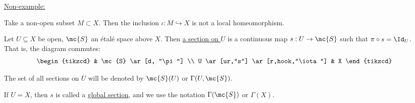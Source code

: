 \documentclass[x11names,reqno,14pt]{extarticle}
\newcommand{\into}{\hookrightarrow}
\begin{document}
\underline{Non-example:} 

Take a non-open subset $M \subset X$. Then the inclusion $\iota:M\into X$ is not a local homeomorphism. 


Let $U\subseteq X$ be open, $\mc{S}$ an \'etal\'e space above $X$. Then \underline{a section on $U$} is a continuous map $s:U\to\mc{S}$ such that $\pi\circ s = \Id_U$. That is, the diagram commutes:
\[
\begin{tikzcd}
& \mc{S} \ar[d, "\pi"] \\
U \ar[ur,"s"] \ar[r,hook,"\iota"] & X
\end{tikzcd}
\]

The set of all sections on $U$ will be denoted by $\mc{S}(U)$ or $\Gamma(U,\mc{S})$. 

If $U = X$, then $s$ is called a \underline{global section}, and we use the notation $\Gamma(\mc{S})$ or $\Gamma(X)$.
\end{document}
